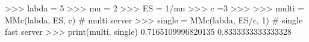 
>>> labda = 5
>>> mu = 2
>>> ES = 1/mu
>>> c =3
>>>
>>> multi  = MMc(labda, ES, c) # multi server
>>> single  = MMc(labda, ES/c, 1) # single fast server
>>> print(multi, single)
0.7165109996820135 0.8333333333333328

